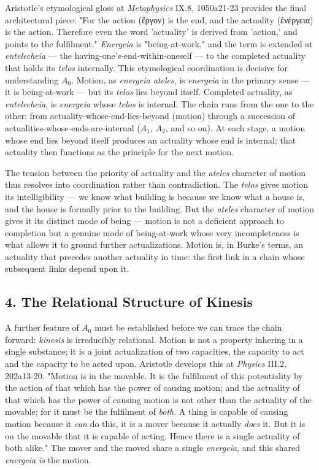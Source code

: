 \documentclass[12pt]{article}
\newcommand{\gk}[1]{{\greekfont #1}}%
\newcommand{\gk}[1]{{\greekfont #1}}%
\newcommand{\gk}[1]{#1}%
\begin{document}
Aristotle's etymological gloss at \textit{Metaphysics} IX.8, 1050a21-23 provides the final architectural piece: "For the action (\gk{ἔργον}) is the end, and the actuality (\gk{ἐνέργεια}) is the action. Therefore even the word 'actuality' is derived from 'action,' and points to the fulfilment." \textit{Energeia} is "being-at-work," and the term is extended at \textit{entelecheia} --- the having-one's-end-within-oneself --- to the completed actuality that holds its \textit{telos} internally. This etymological coordination is decisive for understanding $A_0$. Motion, as \textit{energeia ateles}, is \textit{energeia} in the primary sense --- it is being-at-work --- but its \textit{telos} lies beyond itself. Completed actuality, as \textit{entelecheia}, is \textit{energeia} whose \textit{telos} is internal. The chain runs from the one to the other: from actuality-whose-end-lies-beyond (motion) through a succession of actualities-whose-ends-are-internal ($A_1$, $A_2$, and so on). At each stage, a motion whose end lies beyond itself produces an actuality whose end is internal; that actuality then functions as the principle for the next motion.

The tension between the priority of actuality and the \textit{ateles} character of motion thus resolves into coordination rather than contradiction. The \textit{telos} gives motion its intelligibility --- we know what building is because we know what a house is, and the house is formally prior to the building. But the \textit{ateles} character of motion gives it its distinct mode of being --- motion is not a deficient approach to completion but a genuine mode of being-at-work whose very incompleteness is what allows it to ground further actualizations. Motion is, in Burke's terms, an actuality that precedes another actuality in time: the first link in a chain whose subsequent links depend upon it.

\subsection*{4. The Relational Structure of Kinesis}

A further feature of $A_0$ must be established before we can trace the chain forward: \textit{kinesis} is irreducibly relational. Motion is not a property inhering in a single substance; it is a joint actualization of two capacities, the capacity to act and the capacity to be acted upon. Aristotle develops this at \textit{Physics} III.2, 202a13-20. "Motion is in the movable. It is the fulfilment of this potentiality by the action of that which has the power of causing motion; and the actuality of that which has the power of causing motion is not other than the actuality of the movable; for it must be the fulfilment of \textit{both}. A thing is capable of causing motion because it \textit{can} do this, it is a mover because it actually \textit{does} it. But it is on the movable that it is capable of acting. Hence there is a single actuality of both alike." The mover and the moved share a single \textit{energeia}, and this shared \textit{energeia} \textit{is} the motion.
\end{document}
